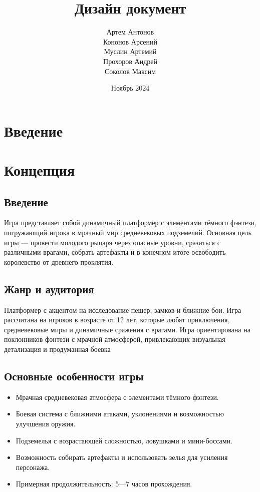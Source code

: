 \documentclass{article}
\title{Дизайн документ}
\author{Артем Антонов \\ Кононов Арсений  \\ Муслин Артемий \\ Прохоров Андрей \\ Соколов Максим}
\date{Ноябрь 2024}
\begin{document}
\maketitle

\tableofcontents

\section{Введение}

\section{Концепция}

\subsection{Введение}
Игра представляет собой динамичный платформер с элементами тёмного фэнтези, погружающий игрока в мрачный мир средневековых подземелий. Основная цель игры — провести молодого рыцаря через опасные уровни, сразиться с различными врагами, собрать артефакты и в конечном итоге освободить королевство от древнего проклятия.

\subsection{Жанр и аудитория}
Платформер с акцентом на исследование пещер, замков и ближние бои. Игра рассчитана на игроков в возрасте от 12 лет, которые любят приключения, средневековые миры и динамичные сражения с врагами. Игра ориентирована на поклонников фэнтези с мрачной атмосферой, привлекающих визуальная детализация и продуманная боевка

\subsection{Основные особенности игры}
\begin{itemize}
    \item Мрачная средневековая атмосфера с элементами тёмного фэнтези.
    \item Боевая система с ближними атаками, уклонениями и возможностью улучшения оружия.
    \item Подземелья с возрастающей сложностью, ловушками и мини-боссами.
    \item Возможность собирать артефакты и использовать зелья для усиления персонажа.
    \item Примерная продолжительность: 5—7 часов прохождения.
\end{itemize}
\end{document}
